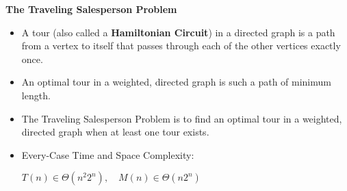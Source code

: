 \documentclass{../cheat}
\begin{document}
\begin{multicols}{3}
	\textbf{The Traveling Salesperson Problem}
	\begin{itemize}
		\item A tour (also called a \textbf{Hamiltonian Circuit}) in a directed graph is a path from a vertex to itself that passes through each of the other vertices exactly once.
		\item An optimal tour in a weighted, directed graph is such a path of minimum length.
		\item The Traveling Salesperson Problem is to find an optimal tour in a weighted, directed graph when at least one tour exists.
		\item Every-Case Time and Space Complexity:\\
			\centerline{$T(n) \in \Theta(n^2 2^n), \quad M(n) \in \Theta(n 2^n)$}
	\end{itemize}
	 
	
	 
	
	 
	

\end{multicols}
\end{document}
